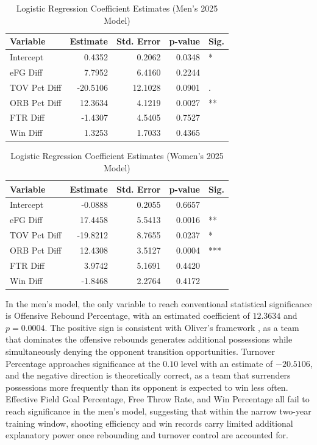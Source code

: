 \documentclass[12pt,leqno]{article}\usepackage[pdftex]{graphicx}\usepackage[dvipsnames]{xcolor}
\theoremstyle{remark}
\begin{document}
\begin{table}[ht]
\centering
\begin{tabular}{lrrrl}
  \hline
Variable & Estimate & Std. Error & p-value & Sig. \\ 
  \hline
Intercept & 0.4352 & 0.2062 & 0.0348 & * \\ 
  eFG Diff & 7.7952 & 6.4160 & 0.2244 &  \\ 
  TOV Pct Diff & -20.5106 & 12.1028 & 0.0901 & . \\ 
  ORB Pct Diff & 12.3634 & 4.1219 & 0.0027 & ** \\ 
  FTR Diff & -1.4307 & 4.5405 & 0.7527 &  \\ 
  Win Diff & 1.3253 & 1.7033 & 0.4365 &  \\ 
   \hline
\end{tabular}
\caption{Logistic Regression Coefficient Estimates (Men's 2025 Model)} 
\label{tab:mens_coef}
\end{table}
\begin{table}[ht]
\centering
\begin{tabular}{lrrrl}
  \hline
Variable & Estimate & Std. Error & p-value & Sig. \\ 
  \hline
Intercept & -0.0888 & 0.2055 & 0.6657 &  \\ 
  eFG Diff & 17.4458 & 5.5413 & 0.0016 & ** \\ 
  TOV Pct Diff & -19.8212 & 8.7655 & 0.0237 & * \\ 
  ORB Pct Diff & 12.4308 & 3.5127 & 0.0004 & *** \\ 
  FTR Diff & 3.9742 & 5.1691 & 0.4420 &  \\ 
  Win Diff & -1.8468 & 2.2764 & 0.4172 &  \\ 
   \hline
\end{tabular}
\caption{Logistic Regression Coefficient Estimates (Women's 2025 Model)} 
\label{tab:womens_coef}
\end{table}


In the men's model, the only variable to reach conventional statistical significance is Offensive Rebound Percentage, with an estimated coefficient of $12.3634$ and $p =0.0004$. The positive sign is consistent with  Oliver's framework \cite{Dean}, as a team that dominates the offensive rebounds generates additional possessions while simultaneously denying the opponent transition opportunities. Turnover Percentage approaches significance at the $0.10$ level with an estimate of $-20.5106$, and the negative direction is theoretically correct, as a team that surrenders possessions more frequently than its opponent is expected to win less often. Effective Field Goal Percentage, Free Throw Rate, and Win Percentage all fail to reach significance in the men's model, suggesting that within the narrow two-year training window, shooting efficiency and win records carry limited additional explanatory power once rebounding and turnover control are accounted for.
\end{document}
